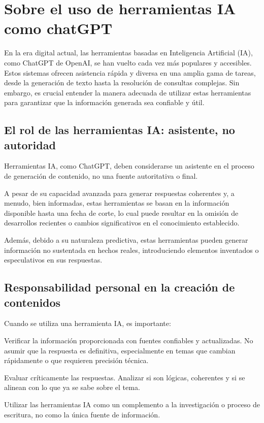 \chapter{Sobre el uso de herramientas IA como chatGPT}
En la era digital actual, las herramientas basadas en Inteligencia Artificial (IA), como ChatGPT de OpenAI, se han vuelto cada vez más populares y accesibles. Estos sistemas ofrecen asistencia rápida y diversa en una amplia gama de tareas, desde la generación de texto hasta la resolución de consultas complejas. Sin embargo, es crucial entender la manera adecuada de utilizar estas herramientas para garantizar que la información generada sea confiable y útil.

\section{El rol de las herramientas IA: asistente, no autoridad}
Herramientas IA, como ChatGPT, deben considerarse un asistente en el proceso de generación de contenido, no una fuente autoritativa o final.  

A pesar de su capacidad avanzada para generar respuestas coherentes y, a menudo, bien informadas, estas herramientas se basan en la información disponible hasta una fecha de corte, lo cual puede resultar en la omisión de desarrollos recientes o cambios significativos en el conocimiento establecido.  

Además, debido a su naturaleza predictiva, estas herramientas pueden generar información no sustentada en hechos reales, introduciendo elementos inventados o especulativos en sus respuestas. 

\section{Responsabilidad personal en la creación de contenidos}
Cuando se utiliza una herramienta IA, es importante: 

Verificar la información proporcionada con fuentes confiables y actualizadas. No asumir que la respuesta es definitiva, especialmente en temas que cambian rápidamente o que requieren precisión técnica. 

Evaluar críticamente las respuestas. Analizar si son lógicas, coherentes y si se alinean con lo que ya se sabe sobre el tema. 

Utilizar las herramientas IA como un complemento a la investigación o proceso de escritura, no como la única fuente de información.


